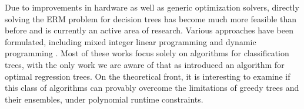 \documentclass[11pt]{article}
\begin{document}
Due to improvements in hardware as well as generic optimization solvers, directly solving the ERM problem for decision trees has become much more feasible than before and is currently an active area of research.
Various approaches have been formulated, including mixed integer linear programming \citep{bertsimas2017optimal,verwer2019learning,zhu2020scalable,aghaei2021strong} and dynamic programming \citep{hu2019optimal,lin2020generalized,aglin2020learning,demirovic2022murtree,zhang2023optimal}.
Most of these works focus solely on algorithms for classification trees, with \cite{zhang2023optimal} the only work we are aware of that as introduced an algorithm for optimal regression trees. On the theoretical front, it is interesting to examine if this class of algorithms can provably overcome the limitations of greedy trees and their ensembles, under polynomial runtime constraints. 








\end{document}
